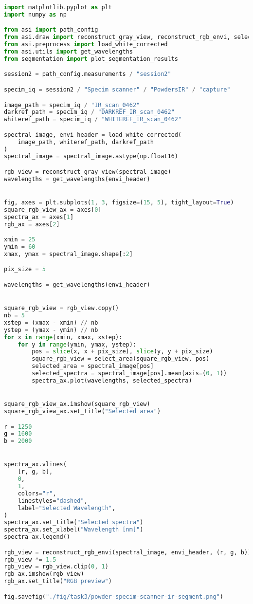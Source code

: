 \begin{lstlisting}[language=python, caption=Segmentation of white poders by Specim Scnaner in infrared wavelengths. Three wavelengths were manually selected for visualization, label={code:powder-segment},]
import matplotlib.pyplot as plt
import numpy as np

from asi import path_config
from asi.draw import reconstruct_gray_view, reconstruct_rgb_envi, select_area
from asi.preprocess import load_white_corrected
from asi.utils import get_wavelengths
from segmentation import plot_segmentation_results

session2 = path_config.measurements / "session2"

specim_iq = session2 / "Specim scanner" / "PowdersIR" / "capture"

image_path = specim_iq / "IR_scan_0462"
darkref_path = specim_iq / "DARKREF_IR_scan_0462"
whiteref_path = specim_iq / "WHITEREF_IR_scan_0462"

spectral_image, envi_header = load_white_corrected(
    image_path, whiteref_path, darkref_path
)
spectral_image = spectral_image.astype(np.float16)

rgb_view = reconstruct_gray_view(spectral_image)
wavelengths = get_wavelengths(envi_header)


fig, axes = plt.subplots(1, 3, figsize=(15, 5), tight_layout=True)
square_rgb_view_ax = axes[0]
spectra_ax = axes[1]
rgb_ax = axes[2]

xmin = 25
ymin = 60
xmax, ymax = spectral_image.shape[:2]

pix_size = 5

wavelengths = get_wavelengths(envi_header)


square_rgb_view = rgb_view.copy()
nb = 5
xstep = (xmax - xmin) // nb
ystep = (ymax - ymin) // nb
for x in range(xmin, xmax, xstep):
    for y in range(ymin, ymax, ystep):
        pos = slice(x, x + pix_size), slice(y, y + pix_size)
        square_rgb_view = select_area(square_rgb_view, pos)
        selected_area = spectral_image[pos]
        selected_spectra = spectral_image[pos].mean(axis=(0, 1))
        spectra_ax.plot(wavelengths, selected_spectra)


square_rgb_view_ax.imshow(square_rgb_view)
square_rgb_view_ax.set_title("Selected area")

r = 1250
g = 1600
b = 2000


spectra_ax.vlines(
    [r, g, b],
    0,
    1,
    colors="r",
    linestyles="dashed",
    label="Selected Wavelength",
)
spectra_ax.set_title("Selected spectra")
spectra_ax.set_xlabel("Wavelength [nm]")
spectra_ax.legend()

rgb_view = reconstruct_rgb_envi(spectral_image, envi_header, (r, g, b))
rgb_view *= 1.5
rgb_view = rgb_view.clip(0, 1)
rgb_ax.imshow(rgb_view)
rgb_ax.set_title("RGB preview")

fig.savefig("./fig/task3/powder-specim-scanner-ir-segment.png")
\end{lstlisting}